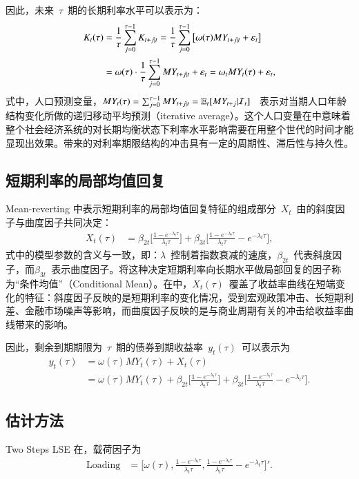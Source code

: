 因此，未来~$\tau$~期的长期利率水平可以表示为：
 \begin{align}\label{k2}
   K_{t}(\tau) &= \frac{1}{\tau}\sum_{j=0}^{\tau-1}K_{t+j|t}
   = \frac{1}{\tau} \sum_{j=0}^{\tau-1} \big[ \omega(\tau) MY_{t+j|t}+\varepsilon_t \big] \nonumber \\
   &= \omega(\tau) \cdot \frac{1}{\tau} \sum_{j=0}^{\tau-1} MY_{t+j|t} + \varepsilon_t
   = \omega_t MY_{t}(\tau) + \varepsilon_t,
 \end{align}
式中，人口预测变量，$MY_{t}(\tau) = \sum_{j=0}^{\tau-1}MY_{t+j|t} = \mathbb{E}_t [MY_{t+j}|\mathcal{I}_t]$~ 表示对当期人口年龄结构变化所做的递归移动平均预测（iterative average）。这个人口变量在中意味着整个社会经济系统的\dsf 对长期均衡状态下利率水平影响需要在用整个世代的时间才能显现出效果。\dsf 带来的对利率期限结构的冲击具有一定的周期性、滞后性与持久性。

\subsection{短期利率的局部均值回复}{Mean-reverting}
中表示短期利率的局部均值回复特征的组成部分~$X_t$~由\dns 的斜度因子与曲度因子共同决定：
 \begin{align}\label{x}
   X_{t}(\tau) &=\beta_{2t} \big[\frac{1-e^{-\lambda_{t} \tau}} {\lambda_{t} \tau} \big]
        + \beta_{3t}\big[\frac{1-e^{-\lambda_{t} \tau}} {\lambda_{t} \tau} - e^{-\lambda_{t} \tau} \big],
 \end{align}
 式中的模型参数的含义与一致，即：$\lambda$~控制着指数衰减的速度，$\beta_{2t}$~代表斜度因子，而$\beta_{3t}$~表示曲度因子。将这种决定短期利率向长期水平做局部回复的因子称为``条件均值''（Conditional Mean）。在中，$X_{t}(\tau)$~覆盖了收益率曲线在短端变化的特征：斜度因子反映的是短期利率的变化情况，受到宏观政策冲击、长短期利差、金融市场噪声等影响，而曲度因子反映的是与商业周期有关的冲击给收益率曲线带来的影响。

因此，剩余到期期限为~$\tau$~期的债券到期收益率~$y_t(\tau)$~可以表示为
 \begin{align}\label{subsection:The Model:y}
   y_{t}(\tau) & = \omega(\tau) MY_{t}(\tau) + X_{t}(\tau) \nonumber \\
   &= \omega(\tau) MY_{t}(\tau)
        + \beta_{2t} \big[\frac{1-e^{-\lambda_{t} \tau}} {\lambda_{t} \tau} \big]
        + \beta_{3t}\big[\frac{1-e^{-\lambda_{t} \tau}} {\lambda_{t} \tau} - e^{-\lambda_{t} \tau} \big].
 \end{align}
 
\subsection{估计方法}{Two Steps LSE} 
 在，载荷因子为
 \begin{align*}
  \mbox{Loading} &= \bigg[ \omega(\tau), \frac{1-e^{-\lambda_{t} \tau}} {\lambda_{t} \tau} , \frac{1-e^{-\lambda_{t} \tau}} {\lambda_{t} \tau} - e^{-\lambda_{t} \tau} \bigg]'.
 \end{align*}
 
